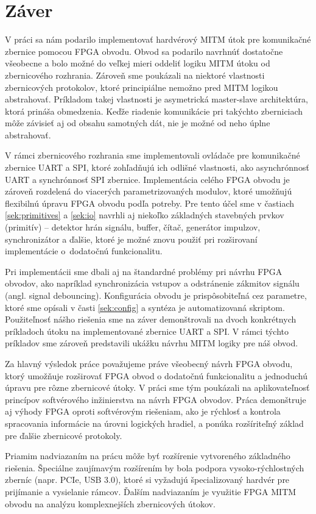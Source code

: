 \chapter*{Záver}  %

V práci sa nám podarilo implementovať hardvérový MITM útok pre komunikačné zbernice pomocou FPGA obvodu. Obvod sa podarilo navrhnúť dostatočne všeobecne a bolo možné do veľkej mieri oddeliť logiku MITM útoku od zbernicového rozhrania. Zároveň sme poukázali na niektoré vlastnosti zbernicových protokolov, ktoré principiálne nemožno pred MITM logikou abstrahovať. Príkladom takej vlastnosti je asymetrická master-slave architektúra, ktorá prináša obmedzenia. Keďže riadenie komunikácie pri takýchto zberniciach môže závisieť aj od obsahu samotných dát, nie je možné od neho úplne abstrahovať.

V rámci zbernicového rozhrania sme implementovali ovládače pre komunikačné zbernice UART a SPI, ktoré zohľadňujú ich odlišné vlastnosti, ako asynchrónnosť UART a synchrónnosť SPI zbernice. Implementácia celého FPGA obvodu je zároveň rozdelená do viacerých parametrizovaných modulov, ktoré umožňujú flexibilnú úpravu FPGA obvodu podľa potreby. Pre tento účel sme v častiach \ref{sek:primitives} a \ref{sek:io} navrhli aj niekoľko základných stavebných prvkov (primitív) -- detektor hrán signálu, buffer, čítač, generátor impulzov, synchronizátor a ďalšie, ktoré je možné znovu použiť pri rozširovaní implementácie o~dodatočnú funkcionalitu.

Pri implementácii sme dbali aj na štandardné problémy pri návrhu FPGA obvodov, ako napríklad synchronizácia vstupov a odstránenie zákmitov signálu (angl. signal debouncing). Konfigurácia obvodu je prispôsobiteľná cez parametre, ktoré sme opísali v časti \ref{sek:config} a syntéza je automatizovaná skriptom. Použiteľnosť nášho riešenia sme na záver demonštrovali na dvoch konkrétnych príkladoch útoku na implementované zbernice UART a SPI. V rámci týchto príkladov sme zároveň predstavili ukážku návrhu MITM logiky pre náš obvod.

Za hlavný výsledok práce považujeme práve všeobecný návrh FPGA obvodu, ktorý umožňuje rozširovať FPGA obvod o dodatočnú funkcionalitu a jednoduchú úpravu pre rôzne zbernicové útoky. V práci sme tým poukázali na aplikovateľnosť princípov softvérového inžinierstva na návrh FPGA obvodov. Práca demonštruje aj výhody FPGA oproti softvérovým riešeniam, ako je rýchlosť a kontrola spracovania informácie na úrovni logických hradiel, a ponúka rozšíriteľný základ pre ďalšie zbernicové protokoly.

Priamim nadviazaním na prácu môže byť rozšírenie vytvoreného základného riešenia. Špeciálne zaujímavým rozšírením by bola podpora vysoko-rýchlostných zberníc (napr. PCIe, USB 3.0), ktoré si vyžadujú špecializovaný hardvér pre prijímanie a vysielanie rámcov. Ďalším nadviazaním je využitie FPGA MITM obvodu na analýzu komplexnejších zbernicových útokov.
